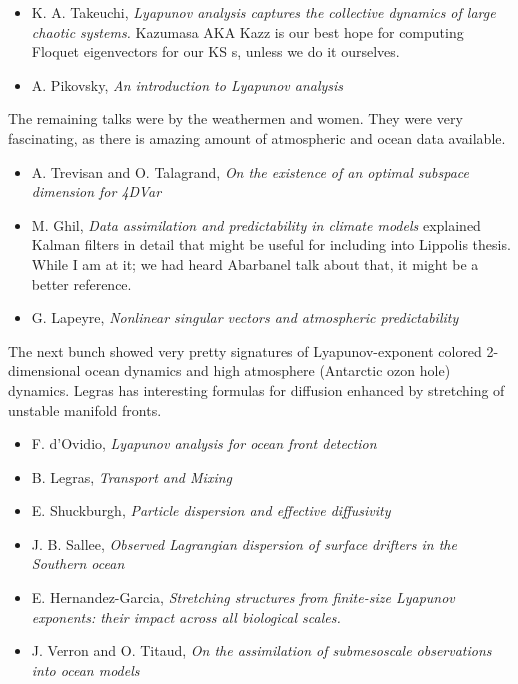 \begin{itemize}
\begin{description}
\end{description}
  \item K. A. Takeuchi, {\em Lyapunov analysis captures
      the collective dynamics of large chaotic
      systems.} Kazumasa AKA Kazz is our best hope for
      computing Floquet eigenvectors for our KS \rpo s,
      unless we do it ourselves.

  \item A. Pikovsky, {\em An introduction to Lyapunov
      analysis
        }
  \end{itemize}
The remaining talks were by the weathermen and women. They were
very fascinating, as there is amazing amount of atmospheric and
ocean data available.
  \begin{itemize}
  \item A. Trevisan and O. Talagrand, {\em On the
      existence of an optimal subspace dimension for
        4DVar }
  \item M. Ghil, {\em Data assimilation and predictability
      in climate models} explained Kalman filters in detail
      that might be useful for including into Lippolis
      thesis. While I am at it; we had heard
      Abarbanel talk about that, it might be a
      better reference.
  \item G. Lapeyre, {\em Nonlinear singular vectors and
      atmospheric predictability }
  \end{itemize}
The next bunch showed very pretty signatures of
Lyapunov-exponent colored 2-dimensional ocean dynamics and
high atmosphere (Antarctic ozon hole) dynamics. Legras has
interesting formulas for diffusion enhanced by stretching
of unstable manifold fronts.
  \begin{itemize}
  \item F. d'Ovidio, {\em Lyapunov analysis for ocean
      front detection }
  \item B. Legras, {\em Transport and Mixing}
  \item E. Shuckburgh, {\em Particle dispersion and
      effective diffusivity }
  \item J. B. Sallee, {\em Observed Lagrangian
      dispersion of surface drifters in the Southern
      ocean }
  \item E. Hernandez-Garcia, {\em Stretching structures
      from finite-size Lyapunov exponents: their impact
      across all biological scales.}
 \item J. Verron and O. Titaud, {\em On the
     assimilation of submesoscale observations into
     ocean models }
  \end{itemize}

